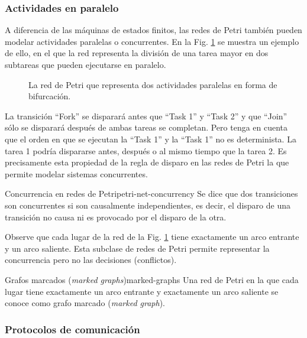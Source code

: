 \subsubsection{Actividades en paralelo}

A diferencia de las máquinas de estados finitos, las redes de Petri también pueden modelar
actividades paralelas o concurrentes.
En la Fig. \ref{fig:parallel-activities-example} se muestra un ejemplo de ello, en el que la
red representa la división de una tarea mayor en dos subtareas que pueden ejecutarse en
paralelo.

\begin{figure}[!htb]
      \centering
      
      \caption{La red de Petri que representa dos actividades paralelas en forma de bifurcación.}
      \label{fig:parallel-activities-example}
\end{figure}

La transición ``Fork'' se disparará antes que ``Task 1'' y ``Task 2'' y que ``Join'' sólo se disparará después
de ambas tareas se completan. Pero tenga en cuenta que el orden en que se ejecutan la ``Task 1'' y
la ``Task 1''  no es determinista. La tarea 1 podría dispararse antes, después o al mismo tiempo
que la tarea 2. Es precisamente esta propiedad de la regla de disparo en las redes de Petri la
que permite modelar sistemas concurrentes.

\begin{definition}{Concurrencia en redes de Petri}{petri-net-concurrency}
      Se dice que dos transiciones son concurrentes si son causalmente independientes, es
      decir, el disparo de una transición no causa ni es provocado por el disparo de la otra.
\end{definition}

Observe que cada lugar de la red de la Fig. \ref{fig:parallel-activities-example}
tiene exactamente un arco entrante y un arco saliente.
Esta subclase de redes de Petri permite representar la concurrencia pero no las
decisiones (conflictos).

\begin{definition}{Grafos marcados (\textit{marked graphs})}{marked-graphs}
      Una red de Petri en la que cada lugar tiene exactamente un arco entrante y exactamente
      un arco saliente se conoce como grafo marcado (\textit{marked graph}).
\end{definition}

\subsubsection{Protocolos de comunicación}

